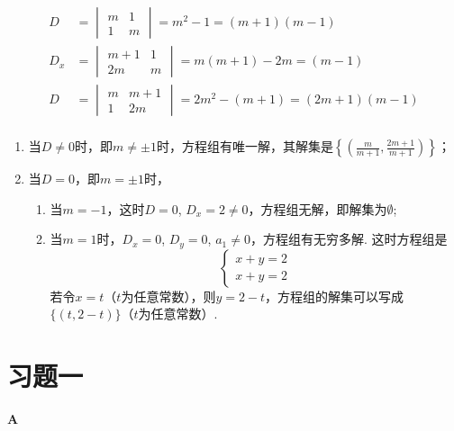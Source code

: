 \begin{solution}
\[\begin{split}
D&=\begin{vmatrix}
  m&1\\1&m
\end{vmatrix}=m^2-1=(m+1)(m-1)\\
D_x&=\begin{vmatrix}
  m+1&1\\2m&m
\end{vmatrix}=m(m+1)-2m=(m-1)\\
D&=\begin{vmatrix}
  m&m+1\\1&2m
\end{vmatrix}=2m^2-(m+1)=(2m+1)(m-1)\\
\end{split}\]
\begin{enumerate}
  \item 当$D\ne 0$时，即$m\ne\pm 1$时，方程组有唯一解，其解集是$\left\{\left(\frac{m}{m+1},\frac{2m+1}{m+1}\right)\right\}$；
  \item 当$D=0$，即$m=\pm 1$时，
\begin{enumerate}[(1)]
  \item 当$m=-1$，这时$D=0$, $D_x=2\ne 0$，方程组无解，即解集为$\emptyset$;
  \item 当$m=1$时，$D_x=0$, $D_y=0$, $a_1\ne 0$，方程组有无穷多解. 这时方程组是
\[\begin{cases}
  x+y=2\\
  x+y=2  
\end{cases}\]
  若令$x=t$（$t$为任意常数），则$y=2-t$，方程组的解集可以写成$\{(t,2-t)\}$（$t$为任意常数）.
\end{enumerate}
\end{enumerate}
\end{solution}

\section*{习题一}
\begin{center}
  \bfseries A
\end{center}

